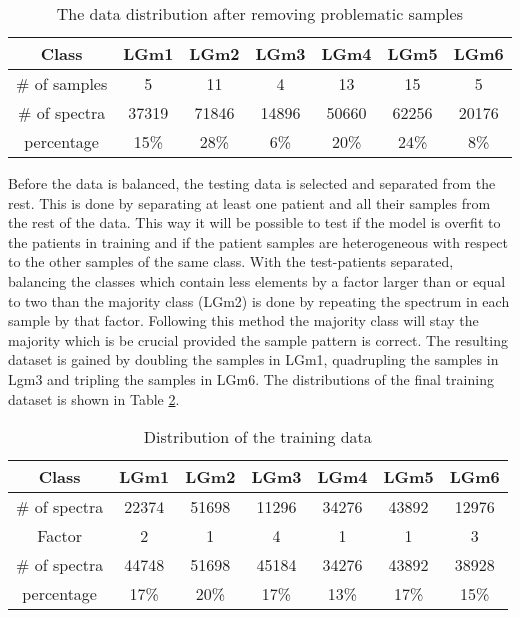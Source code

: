 \begin{table}[h!]
\centering
 \begin{tabular}{||c c c c c c c||} 
 \hline
 Class & LGm1 & LGm2 & LGm3 & LGm4 & LGm5 & LGm6 \\ [0.5ex] 
 \hline\hline
 \# of samples & 5& 11 & 4 & 13 & 15 & 5 \\ 
 \hline
 \# of spectra & 37319 & 71846 & 14896 & 50660 & 62256 & 20176 \\
 \hline
 percentage & 15\%& 28\% & 6\% & 20\% & 24\% & 8\% \\
 \hline

\end{tabular}
\caption{The data distribution after removing problematic samples}
\label{table:2}
\end{table}


Before the data is balanced, the testing data is selected and separated from the rest. This is done by separating at least one patient and all their samples from the rest of the data. This way it will be possible to test if the model is overfit to the patients in training and if the patient samples are heterogeneous  with respect to the other samples of the same class. With the test-patients separated, balancing the classes which contain less elements by a factor larger than or equal to two than the majority class (LGm2) is done by repeating the spectrum in each sample by that factor. Following this method the majority class will stay the majority which is be crucial provided the sample pattern is correct. The resulting dataset is gained by doubling the samples in LGm1, quadrupling the samples in Lgm3 and tripling the samples in LGm6. The distributions of the final training dataset is shown in Table \ref{table:3}.


\begin{table}[h!]
\centering
 \begin{tabular}{||c c c c c c c||} 
 \hline
 Class & LGm1 & LGm2 & LGm3 & LGm4 & LGm5 & LGm6 \\ [0.5ex] 
 \hline\hline
\# of spectra & 22374	& 51698	& 11296	& 34276	& 43892	& 12976 \\
 \hline 
 Factor  & 2 & 1 & 4 & 1 & 1 & 3 \\
 \hline 
 \# of spectra & 44748 & 51698 & 45184 & 34276 & 43892 & 38928 \\
 \hline
 percentage & 17\%& 20\% & 17\% & 13\% & 17\% & 15\% \\
 \hline

\end{tabular}
\caption{Distribution of the training data}
\label{table:3}
\end{table}

